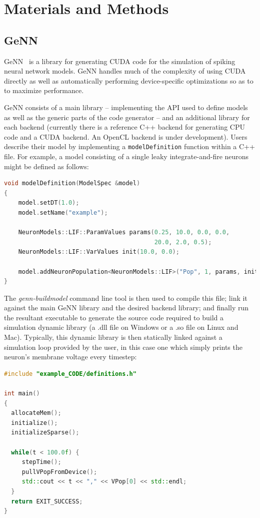 \documentclass[utf8]{frontiersSCNS} %
\begin{document}
\section{Materials and Methods}
\subsection{GeNN}
\label{sec:methods/genn}
GeNN~\citep{Yavuz2016} is a library for generating CUDA code for the simulation of spiking neural network models.
GeNN handles much of the complexity of using CUDA directly as well as automatically performing device-specific optimizations so as to to maximize performance.

GeNN consists of a main library -- implementing the API used to define models as well as the generic parts of the code generator -- and an additional library for each backend (currently there is a reference C++ backend for generating CPU code and a CUDA backend. An OpenCL backend is under development).
Users describe their model by implementing a \lstinline{modelDefinition} function within a C++ file. For example, a model consisting of a single leaky integrate-and-fire neurons might be defined as follows:
%
\begin{lstlisting}[language=C++]
void modelDefinition(ModelSpec &model)
{
    model.setDT(1.0);
    model.setName("example");
    
    NeuronModels::LIF::ParamValues params(0.25, 10.0, 0.0, 0.0, 
                                          20.0, 2.0, 0.5);
    NeuronModels::LIF::VarValues init(10.0, 0.0);
    
    model.addNeuronPopulation<NeuronModels::LIF>("Pop", 1, params, init);
}
\end{lstlisting}
%
The \emph{genn-buildmodel} command line tool is then used to compile this file; link it against the main GeNN library and the desired backend library; and finally run the resultant executable to generate the source code required to build a simulation dynamic library (a .dll file on Windows or a .so file on Linux and Mac).
Typically, this dynamic library is then statically linked against a simulation loop provided by the user, in this case one which simply prints the neuron's membrane voltage every timestep:
%
\begin{lstlisting}[language=C++]
#include "example_CODE/definitions.h"

int main()
{
  allocateMem();
  initialize();
  initializeSparse();

  while(t < 100.0f) {
     stepTime();
     pullVPopFromDevice();
     std::cout << t << "," << VPop[0] << std::endl;
  }
  return EXIT_SUCCESS;
}
\end{lstlisting}
\end{document}

